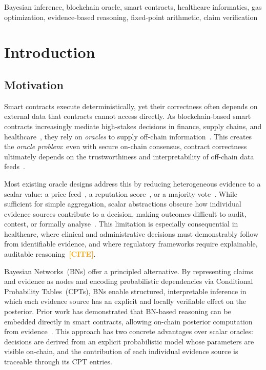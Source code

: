 \documentclass[journal]{IEEEtran}
\newcommand{\addcite}{\textcolor{orange}{\textbf{[CITE]}}}
\begin{document}
\begin{IEEEkeywords}
Bayesian inference, blockchain oracle, smart contracts,
healthcare informatics, gas optimization, evidence-based
reasoning, fixed-point arithmetic, claim verification
\end{IEEEkeywords}

\section{Introduction}
\label{sec:introduction}

\subsection{Motivation}

Smart contracts execute deterministically, yet their
correctness often depends on external data that contracts
cannot access directly.
As blockchain-based smart contracts increasingly mediate
high-stakes decisions in finance, supply chains, and
healthcare~\cite{hameed2024digital}, they rely on
\emph{oracles} to supply off-chain
information~\cite{sheldon2021auditing}.
This creates the \emph{oracle problem}: even with secure
on-chain consensus, contract correctness ultimately depends
on the trustworthiness and interpretability of off-chain
data feeds~\cite{pasdar2023connect}.

Most existing oracle designs address this by reducing
heterogeneous evidence to a scalar value: a price
feed~\cite{zhang2024blockchain,ahmadjee2025decision}, a
reputation
score~\cite{chen2022decentralized,nelaturu2020public,arshad2022reputable,
wang2025efficient}, or a majority
vote~\cite{adler2018astraea,sober2021voting}.
While sufficient for simple aggregation, scalar abstractions
obscure how individual evidence sources contribute to a
decision, making outcomes difficult to audit, contest, or
formally analyse~\cite{pasdar2023connect,ezzat2022blockchain}.
This limitation is especially consequential in healthcare,
where clinical and administrative decisions must
demonstrably follow from identifiable evidence, and where
regulatory frameworks require explainable, auditable
reasoning~\addcite.

Bayesian Networks~(BNs) offer a principled alternative.
By representing claims and evidence as nodes and encoding
probabilistic dependencies via Conditional Probability
Tables~(CPTs), BNs enable structured, interpretable
inference in which each evidence source has an explicit
and locally verifiable effect on the posterior.
Prior work has demonstrated that BN-based reasoning can be
embedded directly in smart contracts, allowing on-chain
posterior computation from evidence~\cite{bn-oracle}.
This approach has two concrete advantages over scalar
oracles: decisions are derived from an explicit
probabilistic model whose parameters are visible on-chain,
and the contribution of each individual evidence source is
traceable through its CPT entries.
\end{document}
